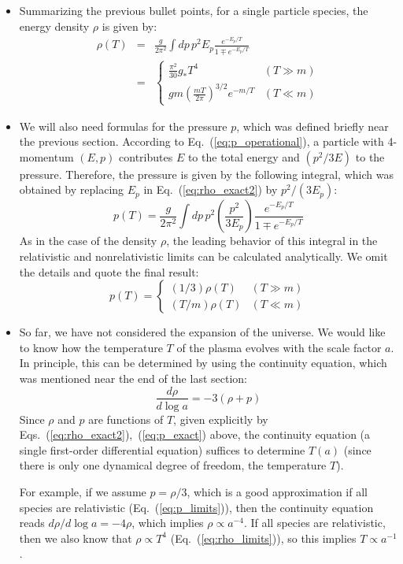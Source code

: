 \documentclass[aps,prd,superscriptaddress,groupedaddress,nofootinbib,nobibnotes]{revtex4}
\newcommand{\be}{\begin{equation}}
\newcommand{\ee}{\end{equation}}
\newcommand{\ba}{\begin{eqnarray}}
\newcommand{\ea}{\end{eqnarray}}
\begin{document}
\begin{itemize}
\item
Summarizing the previous bullet points, for a single particle species, the energy
density $\rho$ is given by:
\ba
\rho(T) &=& \frac{g}{2\pi^2} \int dp \, p^2 E_p \frac{e^{-E_p/T}}{1 \mp e^{-E_p/T}}  \label{eq:rho_exact2} \\
  &=& \left\{ \begin{array}{cl}
   \frac{\pi^2}{30} g_* T^4 & (T \gg m) \\
   gm \left( \frac{mT}{2\pi} \right)^{3/2} e^{-m/T} & (T \ll m)  \label{eq:rho_limits}
\end{array} \right.
\ea

\item
We will also need formulas for the pressure $p$, which was defined briefly near the previous section.
According to Eq.~(\ref{eq:p_operational}), a particle with 4-momentum $(E,p)$ contributes $E$ to the
total energy and $(p^2/3E)$ to the pressure.  Therefore, the pressure is given by the following integral,
which was obtained by replacing $E_p$ in Eq.~(\ref{eq:rho_exact2}) by $p^2/(3E_p)$:
\be
p(T) = \frac{g}{2\pi^2} \int dp \, p^2 \left( \frac{p^2}{3E_p} \right) \frac{e^{-E_p/T}}{1 \mp e^{-E_p/T}}  \label{eq:p_exact}
\ee
As in the case of the density $\rho$, the leading behavior of this integral in the relativistic
and nonrelativistic limits can be calculated analytically.  We omit the details and quote the final result:
\be
p(T)
  = \left\{ \begin{array}{cl}
   (1/3) \rho(T) & (T \gg m) \\
   (T/m) \rho(T) & (T \ll m)
\end{array} \right.  \label{eq:p_limits}
\ee

\item
So far, we have not considered the expansion of the universe.
We would like to know how the temperature $T$ of the plasma evolves with the scale factor $a$.
In principle, this can be determined by using the continuity equation, which was mentioned near the end of the last section:
\be
\frac{d\rho}{d\log a} = -3(\rho + p) \label{eq:continuity2}
\ee
Since $\rho$ and $p$ are functions of $T$, given explicitly by Eqs.~(\ref{eq:rho_exact2}),~(\ref{eq:p_exact}) above,
the continuity equation (a single first-order differential equation) suffices to determine $T(a)$ (since there is
only one dynamical degree of freedom, the temperature $T$).

For example, if we assume $p = \rho/3$, which is a good approximation if all species are relativistic (Eq.~(\ref{eq:p_limits})), then
the continuity equation reads $d\rho/d\log a = -4\rho$, which implies $\rho \propto a^{-4}$.  If all species
are relativistic, then we also know that $\rho \propto T^4$ (Eq.~(\ref{eq:rho_limits})), so this implies
$T \propto a^{-1}$.


\end{itemize}
\end{document}
